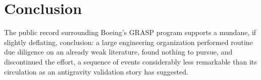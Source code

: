 \documentclass[11pt]{article}
\begin{document}
\section{Conclusion}

The public record surrounding Boeing's GRASP program supports a mundane, if slightly deflating, conclusion: a large engineering organization performed routine due diligence on an already weak literature, found nothing to pursue, and discontinued the effort, a sequence of events considerably less remarkable than its circulation as an antigravity validation story has suggested.
\end{document}

